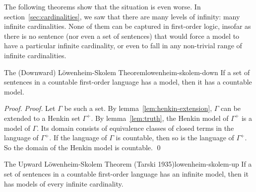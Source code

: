 The following theorems show that
the situation is even worse.
In section~\ref{sec:cardinalities},
we saw that there are many levels of infinity:
many infinite cardinalities.
None of them can be captured in first-order logic,
insofar as there is no sentence (nor even a set of sentences) that would
force a model to have a particular infinite cardinality,
or even to fall in any non-trivial range of infinite cardinalities.

\begin{theorem}{The (Downward) Löwenheim-Skolem Theorem}{lowenheim-skolem-down}
  If a set of sentences in a countable first-order language has a model,
  then it has a countable model.
\end{theorem}

\begin{proof}
  \emph{Proof.}
  Let $\Gamma$ be such a set.
  By lemma~\ref{lem:henkin-extension},
  $\Gamma$ can be extended to a Henkin set $\Gamma^{+}$.
  By lemma~\ref{lem:truth},
  the Henkin model of $\Gamma^{+}$ is a model of $\Gamma$.
  Its domain consists of equivalence classes of closed terms in the language of $\Gamma^{+}$.
  If the language of $\Gamma$ is countable,
  then so is the language of $\Gamma^{+}$.
  So the domain of the Henkin model is countable.
  \qed
\end{proof}

\begin{theorem}{The Upward Löwenheim-Skolem Theorem (Tarski 1935)}{lowenheim-skolem-up}
  If a set of sentences in a countable first-order language has an infinite model,
  then it has models of every infinite cardinality.
\end{theorem}

